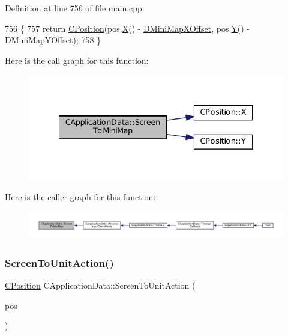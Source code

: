 Definition at line 756 of file main.\+cpp.


\begin{DoxyCode}
756                                                                \{
757     \textcolor{keywordflow}{return} \hyperlink{classCPosition}{CPosition}(pos.\hyperlink{classCPosition_a9a6b94d3b91df1492d166d9964c865fc}{X}() - \hyperlink{classCApplicationData_ae651b9d3963288c5c1f5aaf53bf9401d}{DMiniMapXOffset}, pos.\hyperlink{classCPosition_a1aa8a30e2f08dda1f797736ba8c13a87}{Y}() - 
      \hyperlink{classCApplicationData_ad33fc850bd8262a4bdf1f23e9477d5ad}{DMiniMapYOffset});
758 \}
\end{DoxyCode}
Here is the call graph for this function\+:
\nopagebreak
\begin{figure}[H]
\begin{center}
\leavevmode
\includegraphics[width=334pt]{classCApplicationData_a61dfd0d1f56382b3a8f21add40e1f74a_cgraph}
\end{center}
\end{figure}
Here is the caller graph for this function\+:
\nopagebreak
\begin{figure}[H]
\begin{center}
\leavevmode
\includegraphics[width=350pt]{classCApplicationData_a61dfd0d1f56382b3a8f21add40e1f74a_icgraph}
\end{center}
\end{figure}
\hypertarget{classCApplicationData_a2d956280cfd6074f56db3753c7467248}{}\label{classCApplicationData_a2d956280cfd6074f56db3753c7467248} 
\subsubsection{\texorpdfstring{Screen\+To\+Unit\+Action()}{ScreenToUnitAction()}}
{\footnotesize\ttfamily \hyperlink{classCPosition}{C\+Position} C\+Application\+Data\+::\+Screen\+To\+Unit\+Action (\begin{DoxyParamCaption}\item[{const \hyperlink{classCPosition}{C\+Position} \&}]{pos }\end{DoxyParamCaption})\hspace{0.3cm}{\ttfamily [protected]}}



